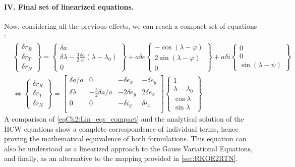 			\paragraph{\textcolor{GMVred}{IV.} Final set of linearized equations. \\}
			\indent Now, considering all the previous effects, we can reach a compact set of equations \cite{Montenbruck_DAmico}:
			\begin{align}
			&\label{eqCh2:Lin_eqs_full} \left\{ \begin{array}{c}
			\delta r_R\\
			\delta r_T\\
			\delta r_N
			\end{array}\right\}
			 = 
			\left\{ \begin{array}{c}
			\delta a\\
			\delta \lambda - \frac{3}{2}\frac{\delta a}{a} (\lambda - \lambda_0) \\
			0
			\end{array}\right\}
			+
			a\delta e \left\{ \begin{array}{c}
			-\cos(\lambda - \varphi)\\
			2\sin (\lambda - \varphi) \\
			0
			\end{array}\right\}
			+
			a\delta i \left\{ \begin{array}{c}
			0 \\
			0 \\
			\sin (\lambda - \psi)
			\end{array}\right\}
			\\
			&\Longleftrightarrow\label{eqCh2:Lin_eqs_compact} \left\{ \begin{array}{c}
			\delta r_R\\
			\delta r_T\\
			\delta r_N
			\end{array}\right\} 
			= 
			\left[\begin{array}{cccc}
			\delta a / a 	& 0 						& -\delta e_x 	& -\delta e_y \\
			\delta \lambda 	& -\frac{3}{2} \delta a / a & -2\delta e_y 	& 2\delta e_x \\
			0				& 0 						& -\delta i_y 	& \delta i_x \\
			\end{array}\right]
			\left\{ \begin{array}{c}
			1\\
			\lambda - \lambda_0\\
			\cos\lambda \\
			\sin \lambda
			\end{array}\right\} 
			\end{align}
			\indent A comparison of \ref{eqCh2:Lin_eqs_compact} and the analytical solution of the HCW equations show a complete correspondence of individual terms, hence proving the mathematical equivalence of both formulations. This equation can also be understood as a linearized approach to the Gauss Variational Equations, and finally, as an alternative to the mapping provided in \ref{sec:RKOE2RTN}.
